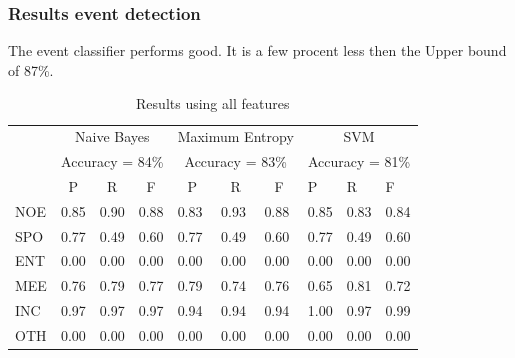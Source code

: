 \documentclass[
10pt, %
a4paper, %
oneside, %
headinclude,footinclude, %
BCOR5mm, %
]{scrartcl}
\begin{document}
\subsubsection{Results event detection}
The event classifier performs good. It is a few procent less then the Upper bound  of 87\%. 

\begin{table}[h]
\caption[Table caption text]{Results using all features }
\begin{tabular}{l|l|l|l|l|l|l|l|l|l|}
\cline{2-10}
                          & \multicolumn{3}{c|}{Naive Bayes}                                         & \multicolumn{3}{c|}{Maximum Entropy}                                     & \multicolumn{3}{c|}{SVM}             \\ \cline{2-10} 
                          & \multicolumn{3}{c|}{Accuracy = 84\%}                                     & \multicolumn{3}{c|}{Accuracy = 83\%}                                     & \multicolumn{3}{c|}{Accuracy = 81\%} \\ \cline{2-10} 
                          & \multicolumn{1}{c|}{P} & \multicolumn{1}{c|}{R} & \multicolumn{1}{c|}{F} & \multicolumn{1}{c|}{P} & \multicolumn{1}{c|}{R} & \multicolumn{1}{c|}{F} & P          & R          & F          \\ \hline
\multicolumn{1}{|l|}{NOE} & 0.85                   & 0.90                   & 0.88                   & 0.83                   & 0.93                   & 0.88                   & 0.85       & 0.83       & 0.84       \\ \hline
\multicolumn{1}{|l|}{SPO} & 0.77                   & 0.49                   & 0.60                   & 0.77                   & 0.49                   & 0.60                   & 0.77       & 0.49       & 0.60       \\ \hline
\multicolumn{1}{|l|}{ENT} & 0.00                   & 0.00                   & 0.00                   & 0.00                   & 0.00                   & 0.00                   & 0.00       & 0.00       & 0.00       \\ \hline
\multicolumn{1}{|l|}{MEE} & 0.76                   & 0.79                   & 0.77                   & 0.79                   & 0.74                   & 0.76                   & 0.65       & 0.81       & 0.72       \\ \hline
\multicolumn{1}{|l|}{INC} & 0.97                   & 0.97                   & 0.97                   & 0.94                   & 0.94                   & 0.94                   & 1.00       & 0.97       & 0.99       \\ \hline
\multicolumn{1}{|l|}{OTH} & 0.00                   & 0.00                   & 0.00                   & 0.00                   & 0.00                   & 0.00                   & 0.00       & 0.00       & 0.00       \\ \hline
\end{tabular}

\end{table}
\end{document}
